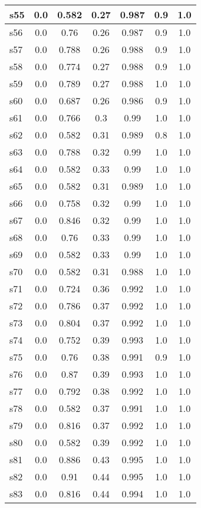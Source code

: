 \documentclass{article}
\begin{document}
\begin{tabular}{|l|c|c|c|c|c|c|}
\hline
s55 &0.0 & 0.582 & 0.27 & 0.987 & 0.9 & 1.0\\
\hline
s56 &0.0 & 0.76 & 0.26 & 0.987 & 0.9 & 1.0\\
\hline
s57 &0.0 & 0.788 & 0.26 & 0.988 & 0.9 & 1.0\\
\hline
s58 &0.0 & 0.774 & 0.27 & 0.988 & 0.9 & 1.0\\
\hline
s59 &0.0 & 0.789 & 0.27 & 0.988 & 1.0 & 1.0\\
\hline
s60 &0.0 & 0.687 & 0.26 & 0.986 & 0.9 & 1.0\\
\hline
s61 &0.0 & 0.766 & 0.3 & 0.99 & 1.0 & 1.0\\
\hline
s62 &0.0 & 0.582 & 0.31 & 0.989 & 0.8 & 1.0\\
\hline
s63 &0.0 & 0.788 & 0.32 & 0.99 & 1.0 & 1.0\\
\hline
s64 &0.0 & 0.582 & 0.33 & 0.99 & 1.0 & 1.0\\
\hline
s65 &0.0 & 0.582 & 0.31 & 0.989 & 1.0 & 1.0\\
\hline
s66 &0.0 & 0.758 & 0.32 & 0.99 & 1.0 & 1.0\\
\hline
s67 &0.0 & 0.846 & 0.32 & 0.99 & 1.0 & 1.0\\
\hline
s68 &0.0 & 0.76 & 0.33 & 0.99 & 1.0 & 1.0\\
\hline
s69 &0.0 & 0.582 & 0.33 & 0.99 & 1.0 & 1.0\\
\hline
s70 &0.0 & 0.582 & 0.31 & 0.988 & 1.0 & 1.0\\
\hline
s71 &0.0 & 0.724 & 0.36 & 0.992 & 1.0 & 1.0\\
\hline
s72 &0.0 & 0.786 & 0.37 & 0.992 & 1.0 & 1.0\\
\hline
s73 &0.0 & 0.804 & 0.37 & 0.992 & 1.0 & 1.0\\
\hline
s74 &0.0 & 0.752 & 0.39 & 0.993 & 1.0 & 1.0\\
\hline
s75 &0.0 & 0.76 & 0.38 & 0.991 & 0.9 & 1.0\\
\hline
s76 &0.0 & 0.87 & 0.39 & 0.993 & 1.0 & 1.0\\
\hline
s77 &0.0 & 0.792 & 0.38 & 0.992 & 1.0 & 1.0\\
\hline
s78 &0.0 & 0.582 & 0.37 & 0.991 & 1.0 & 1.0\\
\hline
s79 &0.0 & 0.816 & 0.37 & 0.992 & 1.0 & 1.0\\
\hline
s80 &0.0 & 0.582 & 0.39 & 0.992 & 1.0 & 1.0\\
\hline
s81 &0.0 & 0.886 & 0.43 & 0.995 & 1.0 & 1.0\\
\hline
s82 &0.0 & 0.91 & 0.44 & 0.995 & 1.0 & 1.0\\
\hline
s83 &0.0 & 0.816 & 0.44 & 0.994 & 1.0 & 1.0\\

\end{tabular}
\end{document}
